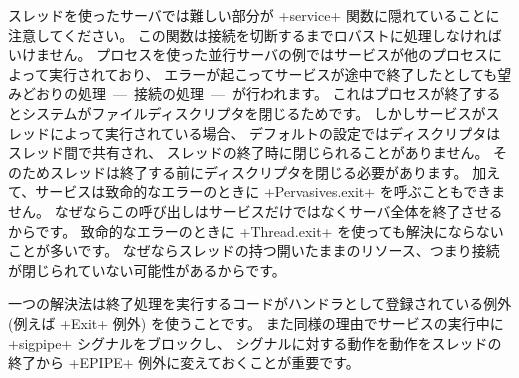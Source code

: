 スレッドを使ったサーバでは難しい部分が
\ml+service+ 関数に隠れていることに注意してください。
この関数は接続を切断するまでロバストに処理しなければいけません。
プロセスを使った並行サーバの例ではサービスが他のプロセスによって実行されており、
エラーが起こってサービスが途中で終了したとしても望みどおりの処理~---~接続の処理~---~が行われます。
これはプロセスが終了するとシステムがファイルディスクリプタを閉じるためです。
しかしサービスがスレッドによって実行されている場合、
デフォルトの設定ではディスクリプタはスレッド間で共有され、
スレッドの終了時に閉じられることがありません。
そのためスレッドは終了する前にディスクリプタを閉じる必要があります。
加えて、サービスは致命的なエラーのときに \ml+Pervasives.exit+ を呼ぶこともできません。
なぜならこの呼び出しはサービスだけではなくサーバ全体を終了させるからです。
致命的なエラーのときに \ml+Thread.exit+ を使っても解決にならないことが多いです。
なぜならスレッドの持つ開いたままのリソース、つまり接続が閉じられていない可能性があるからです。

一つの解決法は終了処理を実行するコードがハンドラとして登録されている例外 (例えば \ml+Exit+ 例外)
を使うことです。
また同様の理由でサービスの実行中に \ml+sigpipe+ シグナルをブロックし、
シグナルに対する動作を動作をスレッドの終了から \ml+EPIPE+ 例外に変えておくことが重要です。


